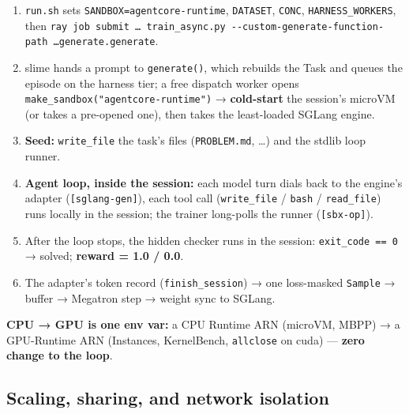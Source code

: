 \documentclass[
  paper=a4,
  ,captions=tableheading
]{scrartcl}
\providecommand{\tightlist}{%
  \setlength{\itemsep}{0pt}\setlength{\parskip}{0pt}}
\begin{document}
\begin{enumerate}
\def\labelenumi{\arabic{enumi}.}
\tightlist
\item
  \texttt{run.sh} sets \texttt{SANDBOX=agentcore-runtime},
  \texttt{DATASET}, \texttt{CONC}, \texttt{HARNESS\_WORKERS}, then
  \texttt{ray\ job\ submit\ …\ train\_async.py\ -\/-custom-generate-function-path\ …generate.generate}.
\item
  slime hands a prompt to \texttt{generate()}, which rebuilds the Task
  and queues the episode on the harness tier; a free dispatch worker
  opens \texttt{make\_sandbox("agentcore-runtime")} →
  \textbf{cold-start} the session's microVM (or takes a pre-opened one),
  then takes the least-loaded SGLang engine.
\item
  \textbf{Seed:} \texttt{write\_file} the task's files
  (\texttt{PROBLEM.md}, \ldots) and the stdlib loop runner.
\item
  \textbf{Agent loop, inside the session:} each model turn dials back to
  the engine's adapter (\texttt{{[}sglang-gen{]}}), each tool call
  (\texttt{write\_file} / \texttt{bash} / \texttt{read\_file}) runs
  locally in the session; the trainer long-polls the runner
  (\texttt{{[}sbx-op{]}}).
\item
  After the loop stops, the hidden checker runs in the session:
  \texttt{exit\_code\ ==\ 0} → solved; \textbf{reward = 1.0 / 0.0}.
\item
  The adapter's token record (\texttt{finish\_session}) → one
  loss-masked \texttt{Sample} → buffer → Megatron step → weight sync to
  SGLang.
\end{enumerate}

\textbf{CPU → GPU is one env var:} a CPU Runtime ARN (microVM, MBPP) → a
GPU-Runtime ARN (Instances, KernelBench, \texttt{allclose} on cuda) ---
\textbf{zero change to the loop}.

\hypertarget{scaling-sharing-and-network-isolation}{%
\subsection{Scaling, sharing, and network
isolation}\label{scaling-sharing-and-network-isolation}}
\end{document}
